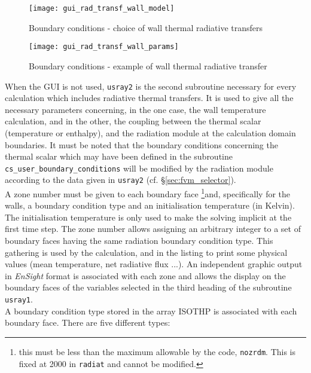 {{\begin{figure}[ht]
\begin{center}
\texttt{[image: gui\_rad\_transf\_wall\_model]}
\caption{Boundary conditions - choice of wall thermal radiative transfers}
\label{fig:6_ray}
\end{center}
\end{figure}

\begin{figure}[ht]
\begin{center}
\texttt{[image: gui\_rad\_transf\_wall\_params]}
\caption{Boundary conditions - example of wall thermal radiative transfer}
\label{fig:7_ray}
\end{center}
\end{figure}

When the GUI is not used, \texttt{usray2} is the second subroutine necessary for every calculation which includes radiative thermal transfers. It is used to give all the
necessary parameters concerning, in the one case, the wall temperature
calculation, and in the other, the coupling between the thermal
scalar (temperature or enthalpy), and the radiation module at the
calculation domain boundaries. It must be noted that the boundary conditions
concerning the thermal scalar which may have been defined in the
subroutine \texttt{cs\_user\_boundary\_conditions} will be modified by the radiation module
according to the data given in \texttt{usray2} (cf. \S\ref{sec:fvm_selector}).\\
A zone number must be given to each boundary face \footnote{this must be less
 than the maximum allowable by the code, \texttt{nozrdm}. This is fixed at 2000
 in \texttt{radiat} and cannot be modified.}and, specifically for
the walls, a boundary condition type and an initialisation temperature
(in Kelvin). The initialisation temperature is only used to make the
solving implicit at the first time step. The zone number allows assigning
an arbitrary integer to a set of boundary faces having the same
radiation boundary condition type. This gathering is used by the
calculation, and in the listing to print some physical values (mean
temperature, net radiative flux ...). An independent graphic output in
{\em EnSight} format is associated with each zone and allows the display on
the boundary faces of the variables selected in the third heading of the
subroutine \texttt{usray1}.\\
A boundary condition type stored in the array ISOTHP is associated with
each boundary face. There are five different types:

}}
